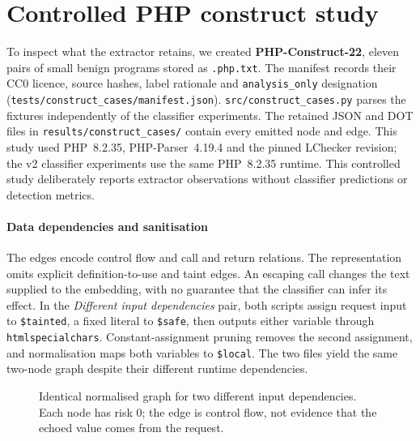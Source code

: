 \section{Controlled PHP construct study}\label{sec:constructs}
To inspect what the extractor retains, we created \textbf{PHP-Construct-22}, eleven pairs of small benign
programs stored as \texttt{.php.txt}. The manifest records their CC0 licence, source hashes, label rationale and
\texttt{analysis\_only} designation (\texttt{tests/construct\_cases/manifest.json}).
\texttt{src/construct\_cases.py} parses the fixtures independently of the classifier experiments.
The retained JSON and DOT files in \texttt{results/construct\_cases/} contain every emitted node and edge.
This study used PHP~8.2.35, PHP-Parser~4.19.4 and the pinned LChecker revision; the v2 classifier
experiments use the same PHP~8.2.35 runtime. This controlled study deliberately reports extractor
observations without classifier predictions or detection metrics.

\begin{table}[!t]\centering\footnotesize
\caption{Observed construct pairs (A/B). ``Same graph'' compares normalised statements, risk and edges,
excluding raw statement text. Risk: 0 normal, 1 callback/obfuscated, 2 critical.}
\label{tab:constructs}

\end{table}

\paragraph{Data dependencies and sanitisation}
The edges encode control flow and call and return relations. The representation omits explicit
definition-to-use and taint edges. An escaping call changes the text supplied to the embedding, with no
guarantee that the classifier can infer its effect. In the \emph{Different input dependencies} pair, both scripts
assign request input to
\texttt{\$tainted}, a fixed literal to \texttt{\$safe}, then outputs either variable through
\texttt{htmlspecialchars}. Constant-assignment pruning removes the second assignment, and normalisation
maps both variables to \texttt{\$local}. The two files yield the same two-node graph despite their different
runtime dependencies.

\begin{figure}[!t]\centering
{}
\caption{Identical normalised graph for two different input dependencies. Each node has risk 0;
the edge is control flow, not evidence that the echoed value comes from the request.}
\label{fig:dataflowloss}
\end{figure}

